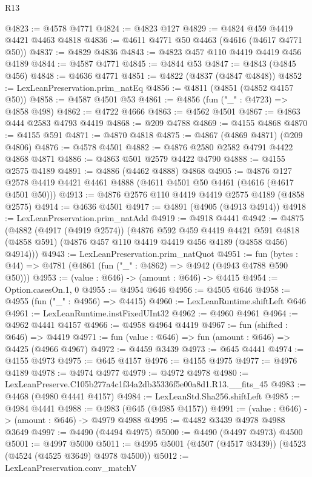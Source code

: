 \begin{lexlean}{R13}
\begin{coremodule}
@4823 := @4578 @4771
@4824 := @4823 @127
@4829 := @4824 @459 @4419 @4421 @4463 @4818
@4836 := @4611 @4771 @50 @4463 (@4616 (@4617 @4771 @50))
@4837 := @4829 @4836
@4843 := @4823 @457 @110 @4419 @4419 @456 @4189
@4844 := @4587 @4771
@4845 := @4844 @53
@4847 := @4843 (@4845 @456)
@4848 := @4636 @4771
@4851 := @4822 (@4837 (@4847 @4848))
@4852 := LexLeanPreservation.prim_natEq
@4856 := @4811 (@4851 (@4852 @4157 @50))
@4858 := @4587 @4501 @53
@4861 := @4856 (fun ("_" : @4723) => @4858 @498)
@4862 := @4722 @4666
@4863 := @4562 @4501
@4867 := @4863 @444 @2583 @4793 @4419
@4868 := @209 @4788
@4869 := @4155 @4868
@4870 := @4155 @591
@4871 := @4870 @4818
@4875 := @4867 (@4869 @4871) (@209 @4806)
@4876 := @4578 @4501
@4882 := @4876 @2580 @2582 @4791 @4422 @4868 @4871
@4886 := @4863 @501 @2579 @4422 @4790
@4888 := @4155 @2575 @4189
@4891 := @4886 (@4462 @4888) @4868
@4905 := @4876 @127 @2578 @4419 @4421 @4461 @4888 (@4611 @4501 @50 @4461 (@4616 (@4617 @4501 @50)))
@4913 := @4876 @2576 @110 @4419 @4419 @2575 @4189 (@4858 @2575)
@4914 := @4636 @4501
@4917 := @4891 (@4905 (@4913 @4914))
@4918 := LexLeanPreservation.prim_natAdd
@4919 := @4918 @4441
@4942 := @4875
    (@4882
      (@4917 (@4919 @2574))
      (@4876
        @592
        @459
        @4419
        @4421
        @591
        @4818
        (@4858 @591)
        (@4876 @457 @110 @4419 @4419 @456 @4189 (@4858 @456) @4914)))
@4943 := LexLeanPreservation.prim_natQuot
@4951 := fun (bytes : @44) => @4781 (@4861 (fun ("_" : @4862) => @4942 (@4943 @4788 @590 @50)))
@4953 := (value : @646) -> (amount : @646) -> @4415
@4954 := Option.casesOn.{1, 0}
@4955 := @4954 @646
@4956 := @4505 @646
@4958 := @4955 (fun ("_" : @4956) => @4415)
@4960 := LexLeanRuntime.shiftLeft @646
@4961 := LexLeanRuntime.instFixedUInt32
@4962 := @4960 @4961
@4964 := @4962 @4441 @4157
@4966 := @4958 @4964 @4419
@4967 := fun (shifted : @646) => @4419
@4971 := fun (value : @646) => fun (amount : @646) => @4425 (@4966 @4967)
@4972 := @4459 @3439
@4973 := @645 @4441
@4974 := @4155 @4973
@4975 := @645 @4157
@4976 := @4155 @4975
@4977 := @4976 @4189
@4978 := @4974 @4977
@4979 := @4972 @4978
@4980 := LexLeanPreserve.C105b277a4c1f34a2db35336f5e00a8d1.R13.__fits_45
@4983 := @4468 (@4980 @4441 @4157)
@4984 := LexLeanStd.Sha256.shiftLeft
@4985 := @4984 @4441
@4988 := @4983 (@645 (@4985 @4157))
@4991 := (value : @646) -> (amount : @646) -> @4979 @4988
@4995 := @4482 @3439 @4978 @4988 @3649
@4997 := @4490 (@4494 @4975)
@5000 := @4490 (@4497 @4973) @4500
@5001 := @4997 @5000
@5011 := @4995 @5001 (@4507 (@4517 @3439)) (@4523 (@4524 (@4525 @3649) @4978 @4500))
@5012 := LexLeanPreservation.conv_matchV

\end{coremodule}
\end{lexlean}
